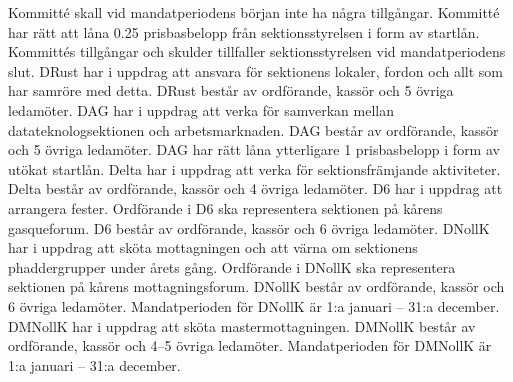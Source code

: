 \documentclass[a4paper]{dteklag}
\newcommand{\prisbasbelopp}[1]{
    #1 prisbasbelopp
    \ifdef{\nuvarandeprisbasbelopp}{
        \marginpar{
            \small{ \textbf{\roundandprint{\xintiexpr#1 * \nuvarandeprisbasbelopp\relax}kr}}
        }
    }{}
}
\begin{document}
\para Kommitté skall vid mandatperiodens början inte ha några tillgångar.
\para Kommitté har rätt att låna \prisbasbelopp{0.25} från sektionsstyrelsen i form av startlån.
\para Kommittés tillgångar och skulder tillfaller sektionsstyrelsen vid mandatperiodens slut.
\para[DRust] DRust har i uppdrag att ansvara för sektionens lokaler, fordon och allt som har samröre med detta.
\para DRust består av ordförande, kassör och 5 övriga ledamöter.
\para[DAG] DAG har i uppdrag att verka för samverkan mellan datateknologsektionen och arbetsmarknaden.
\para DAG består av ordförande, kassör och 5 övriga ledamöter.
\para DAG har rätt låna ytterligare \prisbasbelopp{1} i form av utökat startlån.
\para[Delta] Delta har i uppdrag att verka för sektionsfrämjande aktiviteter.
\para Delta består av ordförande, kassör och 4 övriga ledamöter.
\para[D6] D6 har i uppdrag att arrangera fester.
\para Ordförande i D6 ska representera sektionen på kårens gasqueforum.
\para D6 består av ordförande, kassör och 6 övriga ledamöter.
\para[DNollK] DNollK har i uppdrag att sköta mottagningen och att värna om sektionens phaddergrupper under årets gång.
\para Ordförande i DNollK ska representera sektionen på kårens mottagningsforum.
\para DNollK består av ordförande, kassör och 6 övriga ledamöter.
\para Mandatperioden för DNollK är 1:a januari – 31:a december.
\para[DMNollK] DMNollK har i uppdrag att sköta mastermottagningen.
\para DMNollK består av ordförande, kassör och 4–5 övriga ledamöter.
\para Mandatperioden för DMNollK är 1:a januari – 31:a december.
\end{document}
